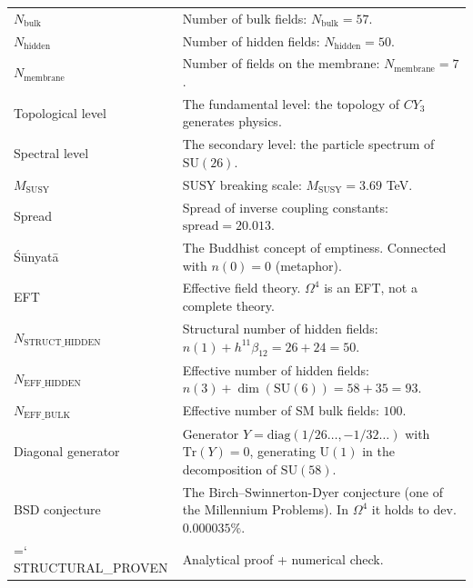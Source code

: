 \documentclass[11pt,a4paper]{article}
\newcommand{\SU}{\mathrm{SU}}
\newcommand{\CY}{CY_3}
\newcommand{\Om}{\Omega^4}
\newcommand{\Nbulk}{N_{\text{bulk}}}
\newcommand{\Nhidden}{N_{\text{hidden}}}
\newcommand{\Nmembrane}{N_{\text{membrane}}}
\newcommand{\MSUSY}{M_{\text{SUSY}}}
\renewcommand{\texttt}[1]{{\ttfamily\hyphenchar\font=`\- #1}}
\theoremstyle{definition}
\begin{document}
\begin{center}
\begin{longtable}{p{3.5cm}p{10cm}}
$\Nbulk$ & 
    Number of bulk fields: $\Nbulk = 57$. \\[0.3em]

$\Nhidden$ & 
    Number of hidden fields: $\Nhidden = 50$. \\[0.3em]

$\Nmembrane$ & 
    Number of fields on the membrane: $\Nmembrane = 7$. \\[0.3em]

Topological level & 
    The fundamental level: the topology of $\CY$ generates 
    physics. \\[0.3em]

Spectral level & 
    The secondary level: the particle spectrum of $\SU(26)$. \\[0.3em]

$\MSUSY$ & 
    SUSY breaking scale: $\MSUSY = 3.69$ TeV. \\[0.3em]

Spread & 
    Spread of inverse coupling constants: $\text{spread} = 20.013$. \\[0.3em]

Śūnyatā & 
    The Buddhist concept of emptiness. Connected with $n(0) = 0$ 
    (metaphor). \\[0.3em]

EFT & 
    Effective field theory. $\Om$ is an EFT, not a complete theory. \\[0.3em]

$N_{\text{STRUCT\_HIDDEN}}$ & 
    Structural number of hidden fields:
    $n(1) + h^{11}\beta_{12} = 26 + 24 = 50$. \\[0.3em]

$N_{\text{EFF\_HIDDEN}}$ & 
    Effective number of hidden fields:
    $n(3) + \dim(\SU(6)) = 58 + 35 = 93$. \\[0.3em]

$N_{\text{EFF\_BULK}}$ & 
    Effective number of SM bulk fields: $100$. \\[0.3em]

Diagonal generator & 
    Generator $Y = \mathrm{diag}(1/26 \ldots, -1/32 \ldots)$
    with $\mathrm{Tr}(Y) = 0$, generating $\mathrm{U}(1)$
    in the decomposition of $\SU(58)$. \\[0.3em]

BSD conjecture & 
    The Birch--Swinnerton-Dyer conjecture (one of the Millennium
    Problems). In $\Om$ it holds to dev. $0.000035\%$. \\[0.3em]

\texttt{STRUCTURAL\_PROVEN} & 
    Analytical proof + numerical check. \\[0.3em]


\end{longtable}
\end{center}
\end{document}

